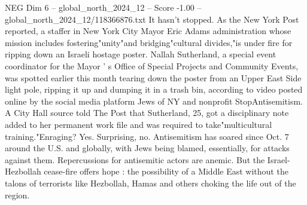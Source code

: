 \begin{textsample}{NEG Dim 6 – global\_north\_2024\_12 – Score -1.00 – global\_north\_2024\_12/118366876.txt}
It hasn't stopped.
As the New York Post reported, a staffer in New York City Mayor Eric Adams administration whose mission includes fostering"unity"and bridging"cultural divides,"is under fire for ripping down an Israeli hostage poster.
Nallah Sutherland, a special event coordinator for the Mayor ' s Office of Special Projects and Community Events, was spotted earlier this month tearing down the poster from an Upper East Side light pole, ripping it up and dumping it in a trash bin, according to video posted online by the social media platform Jews of NY and nonprofit StopAntisemitism.
A City Hall source told The Post that Sutherland, 25, got a disciplinary note added to her permanent work file and was required to take"multicultural training."Enraging?
Yes.
Surprising, no.
Antisemitism has soared since Oct. 7 around the U.S. and globally, with Jews being blamed, essentially, for attacks against them.
Repercussions for antisemitic actors are anemic.
But the Israel-Hezbollah cease-fire offers hope : the possibility of a Middle East without the talons of terrorists like Hezbollah, Hamas and others choking the life out of the region.

\end{textsample}
